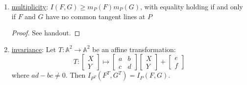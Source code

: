 \documentclass[12pt]{article}
\newcommand{\vbrack}[1]{\langle #1\rangle}
\theoremstyle{definition}
\begin{document}
\begin{enumerate}
    We can build up inductively to \underline{strong additivity}: Suppose $F=\prod\limits_{i=1}^nF_i^{\alpha_i}$, $G=\prod\limits_{j=1}^mG_j^{\beta_j}$, where $F_i$ and $G_j$ are irreducibles. Then 
    \begin{equation}
        I(F,G)=\sum\limits_{i=1}^n\sum\limits_{j=1}^m\alpha_i\beta_jI(F_i,G_j).
    \end{equation}
    \begin{proof}
        (Sketch) Do some reductions:
        \begin{itemize}
            \item Use locality to discard components of $F$, $G$, and $H$ not containing $P$.
            \item Assume $H$ is irreducible.
            \item Assume $F$ and $GH$ have no common components (otherwise both sides of $I(F,GH)=I(F,G)+I(F,H)$ are $\infty$ and so we are done).
            \item Set up an exact sequence:
            \[\{0\}\xlongrightarrow{}\mathcal{O}_P(\mathbb{A}^2)/\vbrack{F,G}\xlongrightarrow{\phi:A\mapsto AH}\mathcal{O}_P(\mathbb{A}^2)/\vbrack{F,GH}\xlongrightarrow{\pi:A\mapsto A}\mathcal{O}_P(\mathbb{A}^2)/\vbrack{F,H}\xlongrightarrow{}\{0\}\]
            Check that this sequence is exact.
            \item Use Exact Dimension Theorem to get $I(F,G)+I(F,H)=I(F,GH)$.
        \end{itemize}
    \end{proof}
    \item \underline{multiplicity}: $I(F,G)\geq m_P(F)m_P(G)$, with equality holding if and only if $F$ and $G$ have no common tangent lines at $P$
    \begin{proof}
        See handout.
    \end{proof}
    \item \underline{invariance}: Let $T:\mathbb{A}^2\to\mathbb{A}^2$ be an affine transformation:
    \[T:\begin{bmatrix}
        X\\
        Y
    \end{bmatrix}\mapsto
    \begin{bmatrix}
        a & b\\
        c & d
    \end{bmatrix}
    \begin{bmatrix}
        X\\
        Y
    \end{bmatrix}
    +
    \begin{bmatrix}
        e\\
        f
    \end{bmatrix}\]
    where $ad-bc\neq0$. Then $I_{P^T}(F^T,G^T)=I_P(F,G)$.
\end{enumerate}
\end{document}
